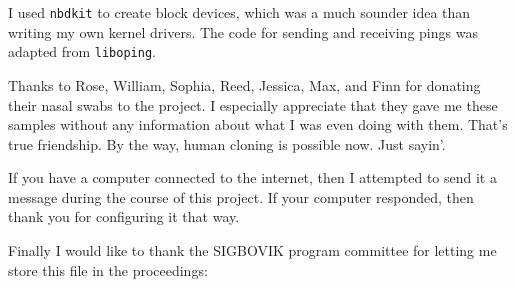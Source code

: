 \documentclass[twocolumn]{article}
\begin{document}
I used {\tt nbdkit} to create block devices, which was a much sounder
idea than writing my own kernel drivers. The code for sending and
receiving pings was adapted from {\tt liboping}.

Thanks to Rose, William, Sophia, Reed, Jessica, Max, and Finn for
donating their nasal swabs to the project. I especially appreciate
that they gave me these samples without any information about what I
was even doing with them. That's true friendship. By the way, human
cloning is possible now. Just sayin'.

If you have a computer connected to the internet, then I attempted
to send it a message during the course of this project. If your
computer responded, then thank you for configuring it that way.

Finally I would like to thank the SIGBOVIK program committee for letting
me store this file in the proceedings:

%

\end{document}
